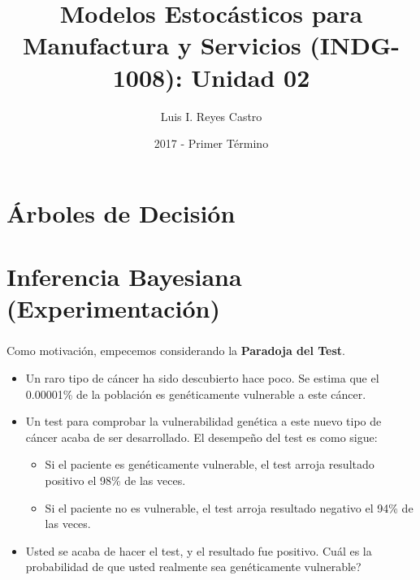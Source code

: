 \documentclass[ 10pt, xcolor = dvipsnames]{beamer}
\title[\shorttitle]{Modelos Estoc\'asticos para Manufactura y Servicios (INDG-1008): \textbf{Unidad 02} }
\author[L. I. Reyes Castro]{Luis I. Reyes Castro}
\institute[ESPOL]{\normalsize Escuela Superior Polit\'ecnica del Litoral (ESPOL) \\ Guayaquil - Ecuador}
\date[2017-T1]{2017 - Primer T\'ermino}
\begin{document}




\section{\'Arboles de Decisi\'on}

\begin{frame}[allowframebreaks]
\frametitle{\insertsection}

\end{frame}

\section{Inferencia Bayesiana (Experimentaci\'on)}

\begin{frame}[allowframebreaks]
\frametitle{\insertsection}

Como motivaci\'on, empecemos considerando la \textbf{Paradoja del Test}. 
\begin{itemize}
\item Un raro tipo de c\'ancer ha sido descubierto hace poco. Se estima que el 0.00001\% de la poblaci\'on es gen\'eticamente vulnerable a este c\'ancer. 
\item Un test para comprobar la vulnerabilidad gen\'etica a este nuevo tipo de c\'ancer acaba de ser desarrollado. El desempe\~no del test es como sigue: 
\begin{itemize}
\item Si el paciente es gen\'eticamente vulnerable, el test arroja resultado positivo \linebreak el 98\% de las veces. 
\item Si el paciente no es vulnerable, el test arroja resultado negativo el 94\% \linebreak de las veces. 
\end{itemize}
\item Usted se acaba de hacer el test, y el resultado fue positivo. Cu\'al es la probabilidad de que usted realmente sea gen\'eticamente vulnerable? 
\end{itemize}

\end{frame}
\end{document}
